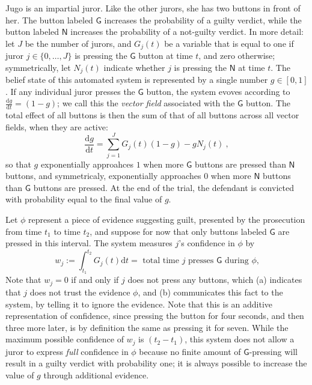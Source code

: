 \begin{example}\label{ex:jugo}
Jugo is an impartial juror.
Like the other jurors, she has two buttons in front of her.
The button labeled $\mathsf G$ increases the probability 
of a guilty verdict, while the button labeled $\mathsf N$ increases
the probability of a not-guilty verdict. 
In more detail: let $J$ be the number of jurors, and $G_j(t)$ be
a variable that is equal to one if juror $j \in \{0, \ldots, J\}$
is pressing the $\mathsf G$ button at time $t$, and zero otherwise; 
symmetrically, let $N_j(t)$ indicate whether $j$ is pressing the $\mathsf N$ at 
time $t$. The belief state of this automated system is
represented by a single number $g \in [0,1]$.
If any individual juror presses the $\mathsf G$ button, 
the system evoves according to $\frac{\mathrm dg}{\mathrm dt} = (1-g)$;
we call this the \emph{vector field} associated with the $\mathsf G$ button.
The total effect of all buttons is then the sum of that of all buttons across all vector fields, when they are active:
\[
	\frac{\mathrm dg}{\mathrm dt} = 
	\sum_{j = 1}^J G_j(t) (1-g) 
		- g N_j(t)~,
\]
so that $g$ exponentially approahces $1$ when more $\mathsf G$ buttons are pressed than $\mathsf N$ buttons,
and symmetricaly, exponentially approaches $0$ when more $\mathsf N$ buttons than $\mathsf G$ buttons are pressed.
At the end of the trial, the defendant is convicted with probability
equal to the final value of $g$. 

Let $\phi$ represent a piece of evidence suggesting guilt, presented by the
prosecution from time $t_1$ to time $t_2$,
and suppose for now that only buttons labeled $\mathsf G$ are pressed
in this interval.
%
The system measures $j$'s confidence in $\phi$ by
\[
	w_j := \!\int_{t_1}^{t_2}\!\! G_j(t) \mathrm d t 
	= \text{ total time $j$ presses $\mathsf G$ during $\phi$,}
\]
Note that $w_j = 0$ if and only if $j$ does not press any buttons,
which (a) indicates that $j$ does not trust the evidence $\phi$, 
and (b) communicates this fact to the system, by telling it to ignore 
the evidence. 
Note that this is an additive representation of confidence, since
pressing the button for four seconds, and then three more later, is
by definition the same as pressing it for seven. 
While the maximum possible confidence of $w_j$ is $(t_2 - t_1)$,
this system does not allow a juror to express \emph{full} confidence in $\phi$
because no finite amount of $\mathsf G$-pressing will result in a 
guilty verdict with probability one; it is always possible to increase
the value of $g$ through additional evidence. 


\end{example}
